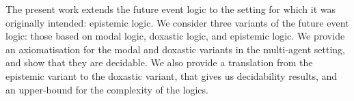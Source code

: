 The present work extends the future event logic to the setting for which it was
originally intended: epistemic logic. We consider three variants of the future
event logic: those based on modal logic, doxastic logic, and epistemic logic. We
provide an axiomatisation for the modal and doxastic variants in the
multi-agent setting, and show that they are decidable. We also provide a
translation from the epistemic variant to the doxastic variant, that gives us
decidability results, and an upper-bound for the complexity of the logics.
